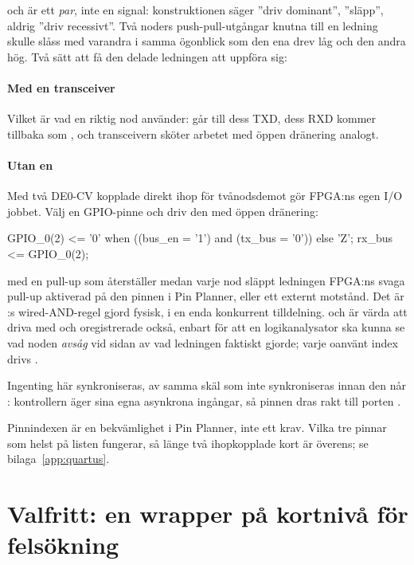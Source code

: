 och  är ett \emph{par}, inte en signal: konstruktionen säger ”driv
dominant”, ”släpp”, aldrig ”driv recessivt”. Två noders push-pull-utgångar knutna till en ledning
skulle slåss med varandra i samma ögonblick som den ena drev låg och den andra hög. Två sätt att få
den delade ledningen att uppföra sig:

\paragraph{Med en transceiver}
Vilket är vad en riktig nod använder:  går till dess TXD, dess RXD kommer tillbaka som
, och transceivern sköter arbetet med öppen dränering analogt.

\paragraph{Utan en}
Med två DE0-CV kopplade direkt ihop för tvånodsdemot gör FPGA:ns egen I/O jobbet. Välj en GPIO-pinne
och driv den med öppen dränering:

\begin{vhdlcode}
GPIO_0(2) <= '0' when ((bus_en = '1') and (tx_bus = '0')) else 'Z';
rx_bus    <= GPIO_0(2);
\end{vhdlcode}

med en pull-up som återställer  medan varje nod släppt ledningen \textemdash{} FPGA:ns
svaga pull-up aktiverad på den pinnen i Pin Planner, eller ett externt motstånd. Det är
:s wired-AND-regel gjord fysisk, i en enda konkurrent tilldelning.
 och  är värda att driva med  och 
oregistrerade också, enbart för att en logikanalysator ska kunna se vad noden \emph{avsåg} vid sidan
av vad ledningen faktiskt gjorde; varje oanvänt index drivs .

Ingenting här synkroniseras, av samma skäl som  inte synkroniseras innan den når
: kontrollern äger sina egna asynkrona ingångar, så pinnen dras rakt till porten
.

Pinnindexen är en bekvämlighet i Pin Planner, inte ett krav. Vilka tre pinnar som helst på listen
fungerar, så länge två ihopkopplade kort är överens; se bilaga~\ref{app:quartus}.

\section{Valfritt: en wrapper på kortnivå för felsökning}
\label{c19:sec:wrapper}

